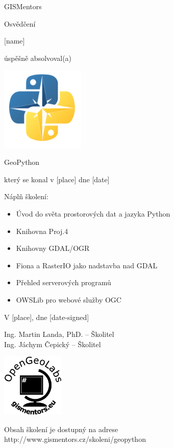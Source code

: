 \documentclass[12pt, a4paper]{letter}
\begin{document}
\pagestyle{empty}
\begin{center}

{\Large GISMentors}

{\Huge Osvědčení}

{\Large [name]}

úspěšně absolvoval(a)

\includegraphics[width=0.30\textwidth]{../images/geopython.png}

{\Large GeoPython}

který se konal v [place] dne [date]
\end{center}

Náplň školení:

\begin{itemize}
    \item Úvod do světa prostorových dat a jazyka Python
    \item Knihovna Proj.4
    \item Knihovny GDAL/OGR
    \item Fiona a RasterIO jako nadstavba nad GDAL
    \item Přehled serverových programů
    \item OWSLib pro webové služby OGC
\end{itemize}

\vfill
\parbox{7cm}{

    V [place], dne [date-signed]\\

\vfill

    Ing. Martin Landa, PhD. -- Školitel\\

\vfill
    Ing. Jáchym Čepický -- Školitel
}
\hfill
\parbox{3cm}{
    \includegraphics[width=3cm]{../images/placka.eps}
}

\vfill

\begin{center}
{\footnotesize Obsah školení je dostupný na adrese
http://www.gismentors.cz/skoleni/geopython}
\end{center}
\end{document}
